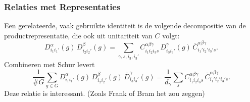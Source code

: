\subsubsection{Relaties met Representaties}
Een gerelateerde, vaak gebruikte identiteit is de volgende decompositie van de productrepresentatie, die ook uit unitariteit van $C$ volgt:
\[
D^\alpha_{i_1 i_1'}(g)\, D^\beta_{i_2 i_2'}(g)
= \sum_{\gamma,s,i_3,i_3'} C^{\alpha\beta\gamma}_{i_1 i_2 i_3 s}\, D^\gamma_{i_3 i_3'}(g)\, \bar{C}^{\alpha\beta\gamma}_{i_1' i_2' i_3' s}.
\]
Combineren met Schur levert
\[
\frac{1}{\#G}\sum_{g\in G} D^\alpha_{i_1 i_1'}(g)\, D^\beta_{i_2 i_2'}(g)\, \bar{D}^\gamma_{i_3 i_3'}(g)
= \frac{1}{d_\gamma}\sum_{s} C^{\alpha\beta\gamma}_{i_1 i_2 i_3 s}\, \bar{C}^{\alpha\beta\gamma}_{i_1' i_2' i_3' s}.
\]
Deze relatie is interessant. (Zoals Frank of Bram het zou zeggen)